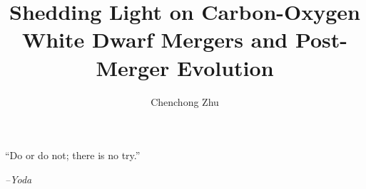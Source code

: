 \documentclass{ut-thesis}
\author{Chenchong Zhu}
\title{Shedding Light on Carbon-Oxygen White Dwarf Mergers and Post-Merger Evolution}
\begin{document}
\begin{preliminary}

\maketitle


\begin{abstract}
\end{abstract}



\vspace*{\fill}
\begin{center}
\begin{minipage}[c]{4.75in}
  ``Do or do not; there is no try.''\vspace{2em}

\hfill \emph{--Yoda}

\end{minipage}
\end{center}
\vspace*{\fill}



\end{preliminary}
\end{document}
